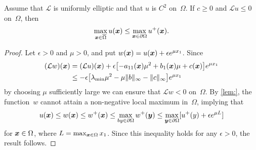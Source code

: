 \begin{theorem}\label{thm: max principle}
Assume that $\mathcal{L}$ is uniformly elliptic and that $u$ is $C^2$ 
on~$\Omega$.  If $c\ge0$ and $\mathcal{L}u\le0$ on~$\Omega$, then 
\[
\max_{\boldsymbol{x}\in\overline{\Omega}}u(\boldsymbol{x})\le\max_{\boldsymbol{x}\in\partial\Omega}u^+(\boldsymbol{x}).
\]
\end{theorem}
\begin{proof}
Let $\epsilon>0$ and $\mu>0$, and put $w(\boldsymbol{x})=u(\boldsymbol{x})+\epsilon e^{\mu x_1}$.
Since
\begin{align*}
(\mathcal{L}w)(\boldsymbol{x})&=(\mathcal{L}u)(\boldsymbol{x})+\epsilon\bigl[-a_{11}(\boldsymbol{x})\mu^2
	+b_1(\boldsymbol{x})\mu+c(\boldsymbol{x})\bigr]e^{\mu x_1}\\
	&\le-\epsilon\bigl[\lambda_{\min}\mu^2
	-\mu\|b\|_\infty-\|c\|_\infty\bigr]e^{\mu x_1}
\end{align*}
by choosing $\mu$ sufficiently large we can ensure that $\mathcal{L}w<0$
on~$\Omega$.  By \cref{lem:}, the function~$w$ cannot attain a non-negative
local maximum in~$\Omega$, implying that 
\[
u(\boldsymbol{x})\le w(\boldsymbol{x})\le w^+(\boldsymbol{x})\le\max_{by\in\partial\Omega}w^+(\boldsymbol{y})
	\le\max_{\boldsymbol{y}\in\partial\Omega}[u^+(y)+\epsilon e^{\mu L}]
\]
for $\boldsymbol{x}\in\Omega$, where $L=\max_{\boldsymbol{x}\in\Omega} x_1$.  Since this inequality
holds for any $\epsilon>0$, the result follows.
\end{proof}

